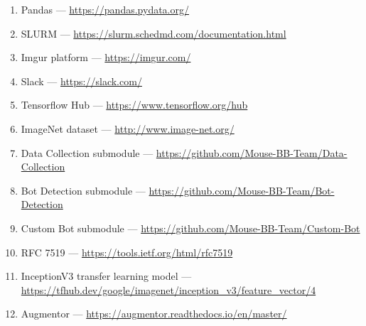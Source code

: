 \begin{enumerate}
    \item Pandas --- \url{https://pandas.pydata.org/}\label{itm:pandas}
    \item SLURM --- \url{https://slurm.schedmd.com/documentation.html}\label{itm:slurm}
    \item Imgur platform --- \url{https://imgur.com/}\label{itm:imgur}
    \item Slack --- \url{https://slack.com/}\label{itm:slack}
    \item Tensorflow Hub --- \url{https://www.tensorflow.org/hub}\label{itm:tensorflow-hub}
    \item ImageNet dataset --- \url{http://www.image-net.org/}\label{itm:image-net}
    \item Data Collection submodule --- \url{https://github.com/Mouse-BB-Team/Data-Collection}\label{itm:data-collection}
    \item Bot Detection submodule --- \url{https://github.com/Mouse-BB-Team/Bot-Detection}\label{itm:bot-detection}
    \item Custom Bot submodule --- \url{https://github.com/Mouse-BB-Team/Custom-Bot}\label{itm:custom-bot}
    \item RFC 7519 --- \url{https://tools.ietf.org/html/rfc7519}\label{itm:rfc-jwt}
    \item InceptionV3 transfer learning model --- \url{https://tfhub.dev/google/imagenet/inception_v3/feature_vector/4}\label{itm:inceptionV3}
    \item Augmentor --- \url{https://augmentor.readthedocs.io/en/master/}\label{itm:augmentor}
\end{enumerate}
\newpage
\thispagestyle{appendix}